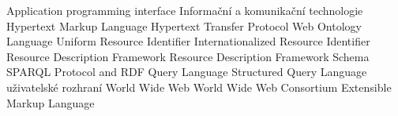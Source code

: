  {Application programming interface}
 {Informační a komunikační technologie}
 {Hypertext Markup Language}
 {Hypertext Transfer Protocol}
 {Web Ontology Language}
 {Uniform Resource Identifier}
 {Internationalized Resource Identifier}
 {Resource Description Framework}
 {Resource Description Framework Schema}
 {SPARQL Protocol and RDF Query Language}
 {Structured Query Language}
 {uživatelské rozhraní}
 {World Wide Web}
 {World Wide Web Consortium}
 {Extensible Markup Language}
